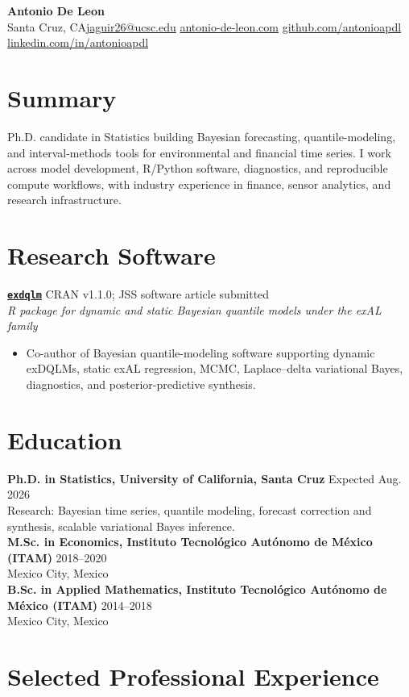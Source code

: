 \documentclass[10pt,letterpaper]{article}
\newcommand{\cvsection}[1]{%
  \Needspace{5\baselineskip}%
  \section*{#1}%
}
\newcommand{\educationentry}[3]{%
  \Needspace{3\baselineskip}%
  \textbf{#1} \hfill #2\\
  #3\\[-1pt]
}
\newcommand{\contactsep}{\enspace\textbar\enspace}
\begin{document}
\color{textgray}

\begin{center}
  {\LARGE\bfseries\color{navy} Antonio De Leon}\\[4pt]
  Santa Cruz, CA\contactsep \href{mailto:jaguir26@ucsc.edu}{jaguir26@ucsc.edu}\contactsep
  \href{https://antonio-de-leon.com}{antonio-de-leon.com}\contactsep
  \href{https://github.com/antonioapdl}{github.com/antonioapdl}\contactsep
  \href{https://linkedin.com/in/antonioapdl}{linkedin.com/in/antonioapdl}
\end{center}

\cvsection{Summary}
Ph.D. candidate in Statistics building Bayesian forecasting, quantile-modeling, and interval-methods tools for environmental and financial time series. I work across model development, R/Python software, diagnostics, and reproducible compute workflows, with industry experience in finance, sensor analytics, and research infrastructure.

\cvsection{Research Software}
\textbf{\href{https://CRAN.R-project.org/package=exdqlm}{\texttt{exdqlm}}} \hfill CRAN v1.1.0; JSS software article submitted\\
\textit{R package for dynamic and static Bayesian quantile models under the exAL family}\\[-4pt]
\begin{itemize}
  \item Co-author of Bayesian quantile-modeling software supporting dynamic exDQLMs, static exAL regression, MCMC, Laplace--delta variational Bayes, diagnostics, and posterior-predictive synthesis.
\end{itemize}

\cvsection{Education}
\educationentry{Ph.D. in Statistics, University of California, Santa Cruz}{Expected Aug. 2026}{Research: Bayesian time series, quantile modeling, forecast correction and synthesis, scalable variational Bayes inference.}
\educationentry{M.Sc. in Economics, Instituto Tecnol\'ogico Aut\'onomo de M\'exico (ITAM)}{2018--2020}{Mexico City, Mexico}
\educationentry{B.Sc. in Applied Mathematics, Instituto Tecnol\'ogico Aut\'onomo de M\'exico (ITAM)}{2014--2018}{Mexico City, Mexico}

\cvsection{Selected Professional Experience}
\end{document}
